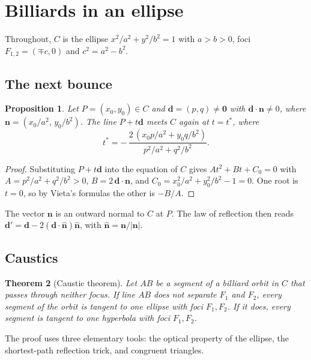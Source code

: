 \documentclass[11pt]{amsart}
\newtheorem{theorem}{Theorem}
\newtheorem{proposition}[theorem]{Proposition}
\theoremstyle{remark}
\begin{document}
\section{Billiards in an ellipse}\label{sec:ellipse}

Throughout, $C$ is the ellipse $x^2/a^2 + y^2/b^2 = 1$ with $a > b > 0$, foci
$F_{1,2} = (\mp c, 0)$ and $c^2 = a^2 - b^2$.

\subsection{The next bounce}

\begin{proposition}\label{prop:next}
Let $P = (x_0, y_0) \in C$ and $\mathbf d = (p, q) \ne \mathbf 0$ with
$\mathbf d \cdot \mathbf n \ne 0$, where $\mathbf n = (x_0/a^2,\, y_0/b^2)$.
The line $P + t\mathbf d$ meets $C$ again at $t = t^\ast$, where
\[
  t^\ast = -\,\frac{2\,(x_0p/a^2 + y_0q/b^2)}{p^2/a^2 + q^2/b^2}.
\]
\end{proposition}

\begin{proof}
Substituting $P + t\mathbf d$ into the equation of $C$ gives
$At^2 + Bt + C_0 = 0$ with $A = p^2/a^2 + q^2/b^2 > 0$,
$B = 2\,\mathbf d\cdot\mathbf n$, and $C_0 = x_0^2/a^2 + y_0^2/b^2 - 1 = 0$.
One root is $t = 0$, so by Vieta's formulas the other is $-B/A$.
\end{proof}

The vector $\mathbf n$ is an outward normal to $C$ at $P$. The law of
reflection then reads $\mathbf d' = \mathbf d - 2(\mathbf d\cdot\hat{\mathbf
n})\hat{\mathbf n}$, with $\hat{\mathbf n} = \mathbf n/|\mathbf n|$.

\subsection{Caustics}

\begin{theorem}[Caustic theorem]\label{thm:caustic}
Let $AB$ be a segment of a billiard orbit in $C$ that passes through neither
focus. If line $AB$ does not separate $F_1$ and $F_2$, every segment of the
orbit is tangent to one ellipse with foci $F_1, F_2$. If it does, every
segment is tangent to one hyperbola with foci $F_1, F_2$.
\end{theorem}

The proof uses three elementary tools: the optical property of the ellipse,
the shortest-path reflection trick, and congruent triangles.
\end{document}
